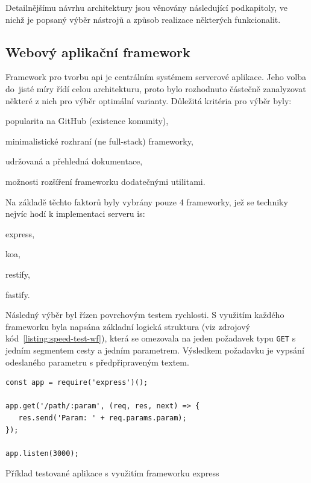 Detailnějšímu návrhu architektury jsou věnovány následující podkapitoly, ve nichž je popsaný výběr nástrojů a způsob realizace některých funkcionalit.




\subsection{Webový aplikační framework}

Framework pro tvorbu \gls{api} je centrálním systémem serverové aplikace. Jeho volba do~jisté míry řídí celou architekturu, proto bylo rozhodnuto částečně zanalyzovat některé z nich pro výběr optimální varianty. Důležitá kritéria pro výběr byly:

\begin{ulnar}
   \item popularita na GitHub (existence komunity),
   \item minimalistické rozhraní (ne full-stack) frameworky,
   \item udržovaná a přehledná dokumentace,
   \item možnosti rozšíření frameworku dodatečnými utilitami.
\end{ulnar}


Na základě těchto faktorů byly vybrány pouze 4 frameworky, jež se techniky nejvíc hodí k implementaci serveru \gls{is}:

\begin{ulnar}
   \item express,
   \item koa,
   \item restify,
   \item fastify.
\end{ulnar}

Následný výběr byl řízen povrchovým testem rychlosti. S využitím každého frameworku byla napsána základní logická struktura  (viz zdrojový kód~\ref{listing:speed-test-wf}), která se omezovala na jeden požadavek typu \texttt{GET} s jedním segmentem cesty a jedním parametrem. Výsledkem požadavku je vypsání odeslaného parametru s předpřipraveným textem.

\begin{fig:code}
	\begin{verbatim}
const app = require('express')();

app.get('/path/:param', (req, res, next) => {
   res.send('Param: ' + req.params.param);
});

app.listen(3000);
   \end{verbatim}
   \caption{Příklad testované aplikace s využitím frameworku express}\label{listing:speed-test-wf}
\end{fig:code}

